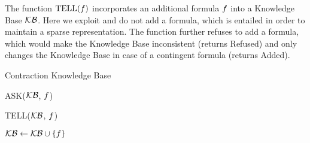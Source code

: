 The function $\mathrm{TELL}(f)$ incorporates an additional formula $f$ into a Knowledge Base $\mathcal{KB}$.
Here we exploit  and do not add a formula, which is entailed in order to maintain a sparse representation. %
The function further refuses to add a formula, which would make the Knowledge Base inconsistent (returns Refused) and only changes the Knowledge Base in case of a contingent formula (returns Added).

%


\begin{algorithm}[hbt!]
\caption{Contraction Knowledge Base}\label{alg:contractionKB}
ASK($\mathcal{KB}$, $f$)
\begin{algorithmic}
	\State{$\hypercoreat{\formulavar} \algdefsymbol \contractionof{\{\secexformulaat{\shortcatvariables} \, : \, \secexformula\in\kb\},\rencodingofat{\exformula}{\formulavar,\shortcatvariables}}{\formulavar}$}
	\EndIf
	\EndIf
	\EndIf
\end{algorithmic}
TELL($\mathcal{KB}$, $f$)
\begin{algorithmic}
	\EndIf
	\EndIf
	\EndIf
		\State $\mathcal{KB} \leftarrow \mathcal{KB}\cup\{f\}$
	\EndIf
\end{algorithmic}

\end{algorithm}




